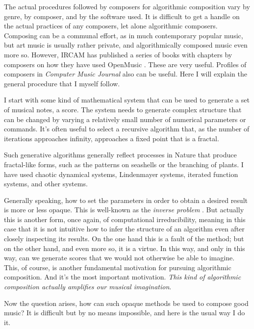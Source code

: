 \documentclass[11pt]{scrartcl}
\begin{document}
The actual procedures followed by composers for algorithmic composition vary by genre, by composer, and by the software used. It is difficult to get a handle on the actual practices of any composers, let alone algorithmic composers. Composing can be a communal effort, as in much contemporary popular music, but art music is usually rather private, and algorithmically composed music even more so. However, IRCAM has published a series of books with chapters by composers on how they have used OpenMusic \parencite{omcomposersbook, agon2006om, agon2008om, agon2016om}. These are very useful. Profiles of composers in \emph{Computer Music Journal} also can be useful. Here I will explain the general procedure that I myself follow.

I start with some kind of mathematical system that can be used to generate a set of musical notes, a score. The system needs to generate complex structure that can be changed by varying a relatively small number of numerical parameters or commands. It’s often useful to select a recursive algorithm that, as the number of iterations approaches infinity, approaches a fixed point that is a fractal.

Such generative algorithms generally reflect processes in Nature that produce fractal-like forms, such as the patterns on seashells or the branching of plants. I have used chaotic dynamical systems, Lindenmayer systems, iterated function systems, and other systems.

Generally speaking, how to set the parameters in order to obtain a desired result is more or less opaque. This is well-known as the \emph{inverse problem} \parencite{graham2021applying, tu2023learning}. But actually this is another form, once again, of computational irreducibility, meaning in this case that it is not intuitive how to infer the structure of an algorithm even after closely inspecting its results. On the one hand this is a fault of the method; but on the other hand, and even more so, it is a virtue. In this way, and only in this way, can we generate scores that we would not otherwise be able to imagine. This, of course, is another fundamental motivation for pursuing algorithmic composition. And it's the most important motivation. \emph{This kind of algorithmic composition actually amplifies our musical imagination}.

Now the question arises, how can such opaque methods be used to compose good music? It is difficult but by no means impossible, and here is the usual way I do it.
\end{document}
